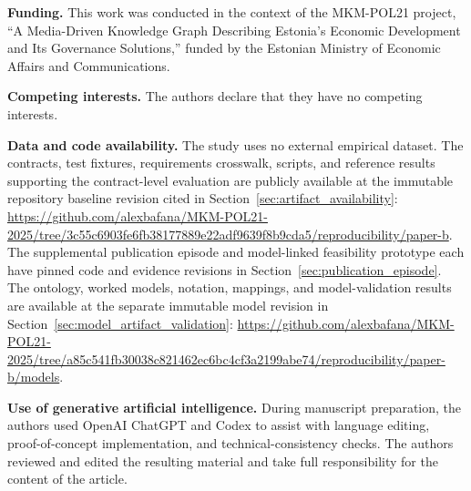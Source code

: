 \documentclass[journal]{IEEEtran}
\begin{document}
\noindent\textbf{Funding.}
This work was conducted in the context of the MKM-POL21 project,
``A Media-Driven Knowledge Graph Describing Estonia's Economic Development
and Its Governance Solutions,'' funded by the Estonian Ministry of Economic
Affairs and Communications.

\smallskip
\noindent\textbf{Competing interests.}
The authors declare that they have no competing interests.

\smallskip
\noindent\textbf{Data and code availability.}
The study uses no external empirical dataset. The contracts, test fixtures,
requirements crosswalk, scripts, and reference results supporting the
contract-level evaluation are publicly available at the immutable repository
baseline revision cited in Section~\ref{sec:artifact_availability}:
\url{https://github.com/alexbafana/MKM-POL21-2025/tree/3c55c6903fe6fb38177889e22adf9639f8b9cda5/reproducibility/paper-b}.
The supplemental publication episode and model-linked feasibility
prototype each have pinned code and evidence revisions in
Section~\ref{sec:publication_episode}. The ontology, worked
models, notation, mappings, and model-validation results are
available at the separate immutable model revision in
Section~\ref{sec:model_artifact_validation}:
\url{https://github.com/alexbafana/MKM-POL21-2025/tree/a85c541fb30038c821462ec6bc4cf3a2199abe74/reproducibility/paper-b/models}.

\smallskip
\noindent\textbf{Use of generative artificial intelligence.}
During manuscript preparation, the authors used OpenAI ChatGPT and Codex to
assist with language editing, proof-of-concept implementation, and technical-consistency checks. The authors
reviewed and edited the resulting material and take full responsibility for
the content of the article.


\ifCLASSOPTIONcaptionsoff
  \newpage
\fi



\end{document}
